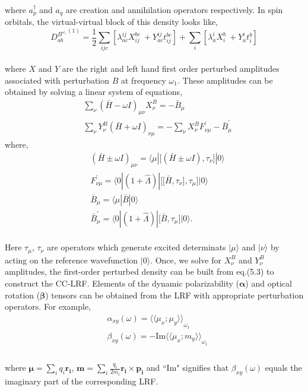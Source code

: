 \\
where $a^{\dagger}_{p}$ and $a_q$ are creation and annihilation operators respectively. 
In spin orbitals, the virtual-virtual block of this density looks like,
\\
\begin{equation}
{D^{B^{\omega_1}}_{ab}}^{(1)}= \frac{1}{2}\sum_{ijc}[\lambda^{ij}_{ac}X^{bc}_{ij} \
+ Y^{ij}_{ac}t^{bc}_{ij}] + \sum_i[\lambda^{i}_{a}X^{b}_{i}\
+ Y^{i}_{a}t^{b}_{i}] 
\end{equation}
\\
where $X$ and $Y$ are the right and left hand first order perturbed amplitudes associated with 
perturbation $B$ at frequency $\omega_1$. These amplitudes can be obtained 
by solving a linear system of equations,  
\\
\begin{equation}
\begin{split}
& \sum_\nu{(\bar{H} - \omega I)}_{\mu\nu}X_{\nu}^{B} = -\bar{B}_{\mu} \\
&\sum_\nu Y_{\nu}^{B}{(\bar{H} + \omega I)}_{\nu\mu}
= -  \sum_\nu X_{\nu}^{B} F^{'}_{\nu\mu} - \bar{B}^{'}_{\mu}
\end{split}
\end{equation}
where,
\begin{equation}
\begin{split}
&{(\bar{H} \pm \omega I)}_{\mu\nu} = \langle \mu | \big[(\bar{H} \pm \omega I),\tau_\nu\big] |0\rangle\\
&F^{'}_{\nu\mu} = \langle 0|(1 + \hat{\Lambda})|\big[\big[\bar{H},\tau_\nu\big],\tau_\mu\big] |0 \rangle\\ 
&\bar{B}_{\mu} = \langle \mu|\bar{B}|0 \rangle \\
& \bar{B}^{'}_{\mu} = \langle 0|(1 + \hat{\Lambda})|\big[\bar{B},\tau_\mu\big] |0 \rangle.
\end{split}
\end{equation}
\\
Here $\tau_\mu$, $\tau_\nu$ are operators which generate excited determinats $|\mu\rangle$
and $|\nu\rangle$ by acting on the reference wavefunction $|0\rangle$. Once, we solve for 
$X_{\nu}^{B}$ and $Y_{\nu}^{B}$ amplitudes, the first-order perturbed density can be built 
from eq.(5.3) to construct the CC-LRF. Elements of the dynamic polarizability ($\bm{\alpha}$) 
and optical rotation ($\bm{\beta}$) tensors can be obtained from the LRF with appropriate 
perturbation operators. For example,
\\
\begin{equation}
\begin{split}
& \alpha_{xy}(\omega) = {\langle\langle \mu_x;\mu_y\rangle\rangle}_{\omega_1}\\
&\beta_{xy}(\omega) = {-\text{Im} \langle\langle \mu_x;m_y\rangle\rangle}_{\omega_1} \\
\end{split}
\end{equation}
\\
where $\bm{\mu} = \sum_i q_i \bm{r_i} $, $\bm{m} = \sum_i \frac{q_i}{2m_i} \bm{r_i} \times \bm{p_i}$
and ``Im" signifies that $\beta_{xy}(\omega)$ equals the imaginary part of the corresponding LRF.
